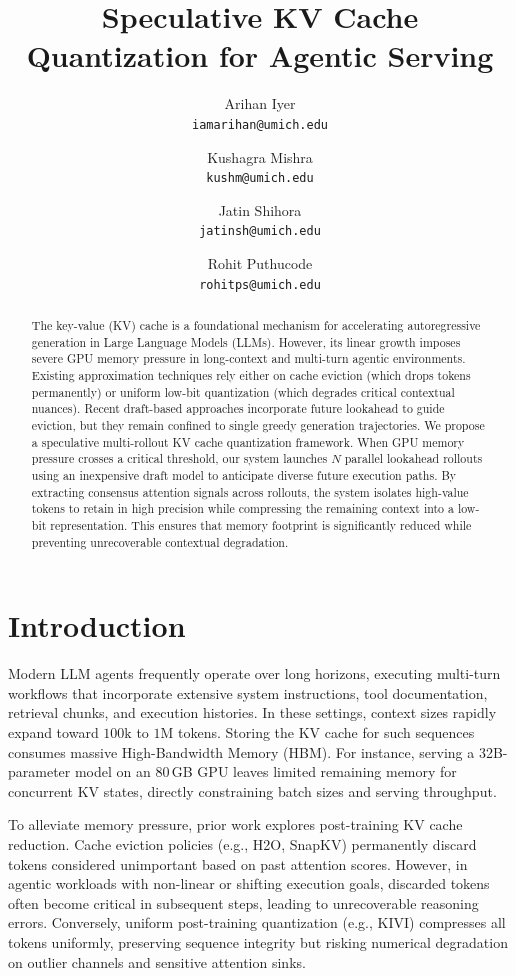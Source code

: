 \documentclass[10pt,twocolumn,letterpaper]{article}
\title{\textbf{Speculative KV Cache Quantization for Agentic Serving}}
\author{
    Arihan Iyer \\ \texttt{iamarihan@umich.edu} \and
    Kushagra Mishra \\ \texttt{kushm@umich.edu} \and
    Jatin Shihora \\ \texttt{jatinsh@umich.edu} \and
    Rohit Puthucode \\ \texttt{rohitps@umich.edu}
}
\date{}
\begin{document}
\maketitle

\begin{abstract}
The key-value (KV) cache is a foundational mechanism for accelerating autoregressive generation in Large Language Models (LLMs). However, its linear growth imposes severe GPU memory pressure in long-context and multi-turn agentic environments. Existing approximation techniques rely either on  cache eviction (which drops tokens permanently) or uniform low-bit quantization (which degrades critical contextual nuances). Recent draft-based approaches incorporate future lookahead to guide eviction, but they remain confined to single greedy generation trajectories. We propose a speculative multi-rollout KV cache quantization framework. When GPU memory pressure crosses a critical threshold, our system launches $N$ parallel lookahead rollouts using an inexpensive draft model to anticipate diverse future execution paths. By extracting consensus attention signals across rollouts, the system isolates high-value tokens to retain in high precision  while compressing the remaining context into a low-bit representation. This ensures that memory footprint is significantly reduced while preventing unrecoverable contextual degradation.
\end{abstract}

\section{Introduction}
Modern LLM agents frequently operate over long horizons, executing multi-turn workflows that incorporate extensive system instructions, tool documentation, retrieval chunks, and execution histories. In these settings, context sizes rapidly expand toward $100\text{k}$ to $1\text{M}$ tokens. Storing the KV cache for such sequences consumes massive High-Bandwidth Memory (HBM). For instance, serving a 32B-parameter model on an 80\,GB GPU leaves limited remaining memory for concurrent KV states, directly constraining batch sizes and serving throughput.

To alleviate memory pressure, prior work explores post-training KV cache reduction. Cache eviction policies (e.g., H2O\cite{h2023}, SnapKV\cite{snapkv24}) permanently discard tokens considered unimportant based on past attention scores. However, in agentic workloads with non-linear or shifting execution goals, discarded tokens often become critical in subsequent steps, leading to unrecoverable reasoning errors. Conversely, uniform post-training quantization (e.g., KIVI\cite{kivi24}) compresses all tokens uniformly, preserving sequence integrity but risking numerical degradation on outlier channels and sensitive attention sinks.
\end{document}
